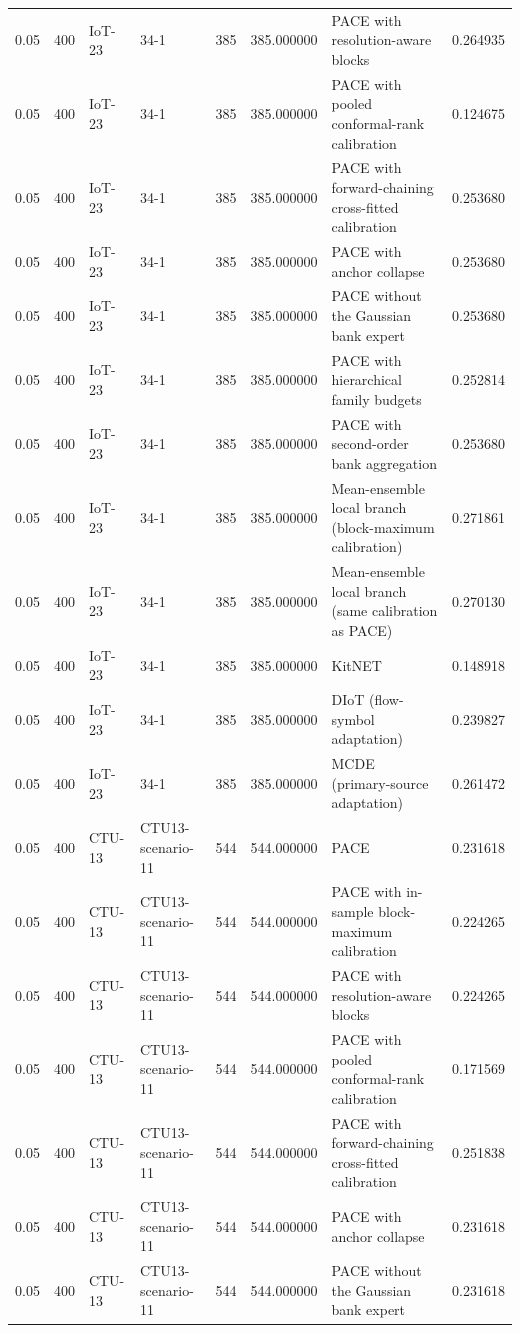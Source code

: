 \begin{tabular}{llllllll}
0.05 & 400 & IoT-23 & 34-1 & 385 & 385.000000 & PACE with resolution-aware blocks & 0.264935 \\
0.05 & 400 & IoT-23 & 34-1 & 385 & 385.000000 & PACE with pooled conformal-rank calibration & 0.124675 \\
0.05 & 400 & IoT-23 & 34-1 & 385 & 385.000000 & PACE with forward-chaining cross-fitted calibration & 0.253680 \\
0.05 & 400 & IoT-23 & 34-1 & 385 & 385.000000 & PACE with anchor collapse & 0.253680 \\
0.05 & 400 & IoT-23 & 34-1 & 385 & 385.000000 & PACE without the Gaussian bank expert & 0.253680 \\
0.05 & 400 & IoT-23 & 34-1 & 385 & 385.000000 & PACE with hierarchical family budgets & 0.252814 \\
0.05 & 400 & IoT-23 & 34-1 & 385 & 385.000000 & PACE with second-order bank aggregation & 0.253680 \\
0.05 & 400 & IoT-23 & 34-1 & 385 & 385.000000 & Mean-ensemble local branch (block-maximum calibration) & 0.271861 \\
0.05 & 400 & IoT-23 & 34-1 & 385 & 385.000000 & Mean-ensemble local branch (same calibration as PACE) & 0.270130 \\
0.05 & 400 & IoT-23 & 34-1 & 385 & 385.000000 & KitNET & 0.148918 \\
0.05 & 400 & IoT-23 & 34-1 & 385 & 385.000000 & DIoT (flow-symbol adaptation) & 0.239827 \\
0.05 & 400 & IoT-23 & 34-1 & 385 & 385.000000 & MCDE (primary-source adaptation) & 0.261472 \\
0.05 & 400 & CTU-13 & CTU13-scenario-11 & 544 & 544.000000 & PACE & 0.231618 \\
0.05 & 400 & CTU-13 & CTU13-scenario-11 & 544 & 544.000000 & PACE with in-sample block-maximum calibration & 0.224265 \\
0.05 & 400 & CTU-13 & CTU13-scenario-11 & 544 & 544.000000 & PACE with resolution-aware blocks & 0.224265 \\
0.05 & 400 & CTU-13 & CTU13-scenario-11 & 544 & 544.000000 & PACE with pooled conformal-rank calibration & 0.171569 \\
0.05 & 400 & CTU-13 & CTU13-scenario-11 & 544 & 544.000000 & PACE with forward-chaining cross-fitted calibration & 0.251838 \\
0.05 & 400 & CTU-13 & CTU13-scenario-11 & 544 & 544.000000 & PACE with anchor collapse & 0.231618 \\
0.05 & 400 & CTU-13 & CTU13-scenario-11 & 544 & 544.000000 & PACE without the Gaussian bank expert & 0.231618 \\

\end{tabular}
